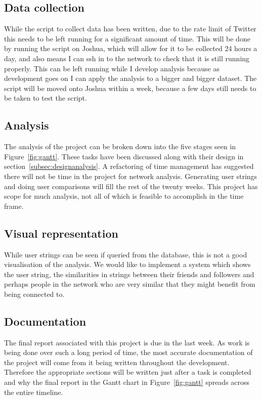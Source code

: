 \documentclass[a4paper]{article}
\begin{document}
\subsection{Data collection}
While the script to collect data has been written, due to the rate limit of Twitter this needs to be left running for a significant amount of time. This will be done by running the script on Joshua, which will allow for it to be collected 24 hours a day, and also means I can ssh in to the network to check that it is still running properly. This can be left running while I develop analysis because as development goes on I can apply the analysis to a bigger and bigger dataset. The script will be moved onto Joshua within a week, because a few days still needs to be taken to test the script.
\subsection{Analysis}
The analysis of the project can be broken down into the five stages seen in Figure~\ref{fig:gantt}. These tasks have been discussed along with their design in section~\ref{subsec:designanalysis}. A refactoring of time management has suggested there will not be time in the project for network analysis. Generating user strings and doing user comparisons will fill the rest of the twenty weeks. This project has scope for much analysis, not all of which is feasible to accomplish in the time frame. 
\subsection{Visual representation}
While user strings can be seen if queried from the database, this is not a good visualisation of the analysis. We would like to implement a system which shows the user string, the similarities in strings between their friends and followers and perhaps people in the network who are very similar that they might benefit from being connected to.
\subsection{Documentation}
The final report associated with this project is due in the last week. As work is being done over such a long period of time, the most accurate documentation of the project will come from it being written throughout the development. Therefore the appropriate sections will be written just after a task is completed and why the final report in the Gantt chart in Figure~\ref{fig:gantt} spreads across the entire timeline.
\end{document}
